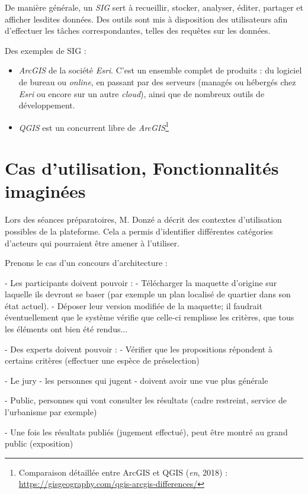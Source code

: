 De manière générale, un \textit{SIG} sert à recueillir, stocker, analyser, éditer, partager et afficher lesdites données. Des outils sont mis à disposition des utilisateurs afin d'effectuer les tâches correspondantes, telles des requêtes sur les données.

Des exemples de SIG :

\begin{itemize}
    \item \textit{ArcGIS} de la société \textit{Esri}. C'est un ensemble complet de produits : du logiciel de bureau ou \textit{online}, en passant par des serveurs (managés ou hébergés chez \textit{Esri} ou encore sur un autre \textit{cloud}), ainsi que de nombreux outils de développement.
    \item \textit{QGIS} est un concurrent libre de \textit{ArcGIS}\footnote{Comparaison détaillée entre ArcGIS et QGIS (\textit{en}, 2018) : \url{https://gisgeography.com/qgis-arcgis-differences/}}
\end{itemize}

\section{Cas d'utilisation, Fonctionnalités imaginées}

Lors des séances préparatoires, M. Donzé a décrit des contextes d'utilisation possibles de la plateforme. Cela a permis d'identifier différentes catégories d'acteurs qui pourraient être amener à l'utiliser.

Prenons le cas d'un concours d'architecture :

- Les participants doivent pouvoir :
    - Télécharger la maquette d'origine sur laquelle ils devront se baser (par exemple un plan localisé de quartier dans son état actuel).
    - Déposer leur version modifiée de la maquette; il faudrait éventuellement que le système vérifie que celle-ci remplisse les critères, que tous les éléments ont bien été rendus...

- Des experts doivent pouvoir :
    - Vérifier que les propositions répondent à certains critères (effectuer une espèce de préselection)
    
- Le jury - les personnes qui jugent - doivent avoir une vue plus générale

- Public, personnes qui vont consulter les résultats (cadre restreint, service de l'urbanisme par exemple)

- Une fois les résultats publiés (jugement effectué), peut être montré au grand public (exposition)

